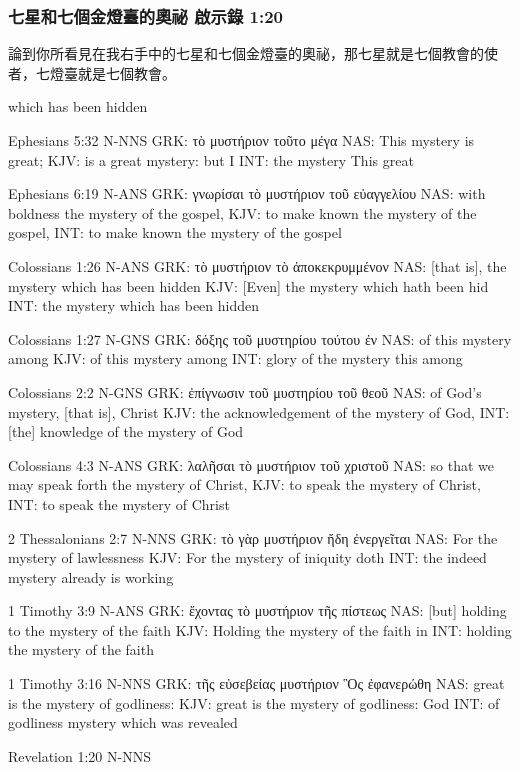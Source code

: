  \subsubsection{七星和七個金燈臺的奧祕 啟示錄 1:20}
論到你所看見在我右手中的七星和七個金燈臺的奧祕，那七星就是七個教會的使者，七燈臺就是七個教會。
 


  which has been hidden

Ephesians 5:32 N-NNS
GRK: τὸ μυστήριον τοῦτο μέγα
NAS: This mystery is great;
KJV: is a great mystery: but I
INT: the mystery This great

Ephesians 6:19 N-ANS
GRK: γνωρίσαι τὸ μυστήριον τοῦ εὐαγγελίου
NAS: with boldness the mystery of the gospel,
KJV: to make known the mystery of the gospel,
INT: to make known the mystery of the gospel

Colossians 1:26 N-ANS
GRK: τὸ μυστήριον τὸ ἀποκεκρυμμένον
NAS: [that is], the mystery which has been hidden
KJV: [Even] the mystery which hath been hid
INT: the mystery which has been hidden

Colossians 1:27 N-GNS
GRK: δόξης τοῦ μυστηρίου τούτου ἐν
NAS: of this mystery among
KJV: of this mystery among
INT: glory of the mystery this among

Colossians 2:2 N-GNS
GRK: ἐπίγνωσιν τοῦ μυστηρίου τοῦ θεοῦ
NAS: of God's mystery, [that is], Christ
KJV: the acknowledgement of the mystery of God,
INT: [the] knowledge of the mystery of God

Colossians 4:3 N-ANS
GRK: λαλῆσαι τὸ μυστήριον τοῦ χριστοῦ
NAS: so that we may speak forth the mystery of Christ,
KJV: to speak the mystery of Christ,
INT: to speak the mystery of Christ

2 Thessalonians 2:7 N-NNS
GRK: τὸ γὰρ μυστήριον ἤδη ἐνεργεῖται
NAS: For the mystery of lawlessness
KJV: For the mystery of iniquity doth
INT: the indeed mystery already is working

1 Timothy 3:9 N-ANS
GRK: ἔχοντας τὸ μυστήριον τῆς πίστεως
NAS: [but] holding to the mystery of the faith
KJV: Holding the mystery of the faith in
INT: holding the mystery of the faith

1 Timothy 3:16 N-NNS
GRK: τῆς εὐσεβείας μυστήριον Ὃς ἐφανερώθη
NAS: great is the mystery of godliness:
KJV: great is the mystery of godliness: God
INT: of godliness mystery which was revealed

Revelation 1:20 N-NNS 



 
 

